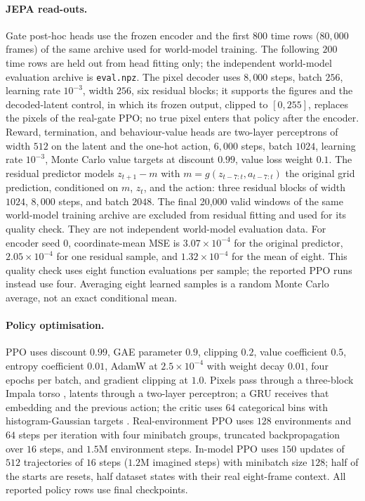 \paragraph{JEPA read-outs.}
Gate post-hoc heads use the frozen encoder and the first $800$ time rows ($80{,}000$ frames) of the same archive used for world-model training. The following $200$ time rows are held out from head fitting only; the independent world-model evaluation archive is \texttt{eval.npz}. The pixel decoder uses $8{,}000$ steps, batch $256$, learning
rate $10^{-3}$, width $256$, six residual blocks; it supports the figures and the decoded-latent control, in which its frozen output, clipped to $[0,255]$, replaces the pixels of the real-gate PPO; no true pixel enters that policy after the encoder. Reward,
termination, and behaviour-value heads are two-layer perceptrons of width $512$ on the latent and the
one-hot action, $6{,}000$ steps, batch $1024$, learning rate $10^{-3}$, Monte Carlo value targets at
discount $0.99$, value loss weight $0.1$. The residual predictor models $z_{t+1}-m$ with
$m=g(z_{t-7:t},a_{t-7:t})$ the original grid prediction, conditioned on $m$, $z_t$, and the action:
three residual blocks of width $1024$, $8{,}000$ steps, and batch $2048$. The final 20,000 valid
windows of the same world-model training archive are excluded from residual fitting and used for
its quality check. They are not independent world-model evaluation data. For encoder seed 0,
coordinate-mean MSE is $3.07\times10^{-4}$ for the original predictor, $2.05\times10^{-4}$ for one
residual sample, and $1.32\times10^{-4}$ for the mean of eight. This quality check uses eight function
evaluations per sample; the reported PPO runs instead use four. Averaging eight learned samples is
a random Monte Carlo average, not an exact conditional mean.

\paragraph{Policy optimisation.}
PPO uses discount $0.99$, GAE parameter $0.9$, clipping $0.2$, value coefficient $0.5$, entropy
coefficient $0.01$, AdamW at $2.5\times10^{-4}$ with weight decay $0.01$, four epochs per batch, and
gradient clipping at $1.0$. Pixels pass through a three-block Impala torso \citep{espeholt2018impala}, latents through a two-layer
perceptron; a GRU receives that embedding and the previous action; the critic uses $64$ categorical
bins with histogram-Gaussian targets \citep{farebrother2024stopregressing}. Real-environment PPO uses $128$ environments and $64$ steps per
iteration with four minibatch groups, truncated backpropagation over $16$ steps, and $1.5$M
environment steps. In-model PPO uses $150$ updates of $512$ trajectories of $16$ steps ($1.2$M
imagined steps) with minibatch size $128$; half of the starts are resets, half dataset states with
their real eight-frame context. All reported policy rows use final checkpoints.

